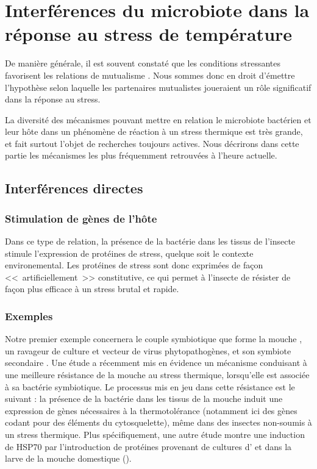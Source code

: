 \chapter{Interférences du microbiote dans la réponse au stress de température} %
	\label{sec:implicationµbiote}

De manière générale, il est souvent constaté que les conditions stressantes favorisent les relations de mutualisme \cite{meadows2013}.
Nous sommes donc en droit d'émettre l'hypothèse selon laquelle les partenaires mutualistes joueraient un rôle significatif dans la réponse au stress.

La diversité des mécanismes pouvant mettre en relation le microbiote bactérien
et leur hôte dans un phénomène de réaction à un stress thermique est très
grande, et fait surtout l'objet de recherches toujours actives. Nous décrirons
dans cette partie les mécanismes les plus fréquemment retrouvées à l'heure
actuelle.


	\section{Interférences directes} %
		\label{sec:direct}

\subsection{Stimulation de gènes de l'hôte} %
\label{sub:genes_hote}

Dans ce type de relation, la présence de la bactérie dans les tissus de
l'insecte stimule l'expression de protéines de stress, quelque soit le
contexte environemental. Les protéines de stress sont donc exprimées de façon
<<~artificiellement~>> constitutive, ce qui permet à l'insecte de résister de façon
plus efficace à un stress brutal et rapide.

\subsection{Exemples} %
\label{sub:exemples}


Notre premier exemple concernera le couple symbiotique que forme la mouche
, un ravageur de culture et vecteur de virus
phytopathogènes, et son symbiote secondaire . Une étude
\cite{brumin2011} a récemment mis en évidence un mécanisme conduisant à une
meilleure résistance de la mouche au stress thermique, lorsqu'elle est
associée à sa bactérie symbiotique. Le processus mis en jeu dans cette
résistance est le suivant : la
présence de la bactérie dans les tissus de la mouche induit une expression de
gènes nécessaires à la thermotolérance (notamment ici des gènes codant pour
des éléments du cytosquelette), même dans des insectes non-soumis à un stress
thermique.
Plus spécifiquement, une autre étude \cite{tang2012} montre une induction de HSP70 par l'introduction de protéines provenant de cultures d' et  dans la larve de la mouche domestique ().

